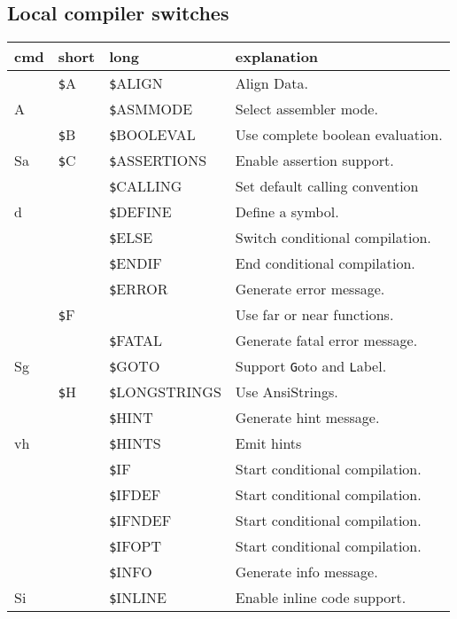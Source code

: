 \documentclass{article}
\newcommand{\var}[1]{{\texttt #1}}
\begin{document}
\thispagestyle{empty}
\subsection*{Local compiler switches}
\begin{tabularx}{\textwidth}{lllX}
\textbf{cmd} & \textbf {short} & \textbf {long} & \textbf{explanation }\\ \hline
& \var{\$A} & \var{\$ALIGN} & Align Data.\\
A & & \var{\$ASMMODE} & Select assembler mode. \\
&\var{\$B} & \var{\$BOOLEVAL} & Use complete boolean evaluation. \\
Sa &\var{\$C} & \var{\$ASSERTIONS} & Enable assertion support. \\
& & \var{\$CALLING} & Set default calling convention \\
d && \var{\$DEFINE} & Define a symbol. \\
&& \var{\$ELSE} & Switch conditional compilation. \\
&& \var{\$ENDIF} & End conditional compilation. \\
&& \var{\$ERROR} & Generate error message. \\
&\var{\$F} & & Use far or near functions. \\
&&  \var{\$FATAL} & Generate fatal error message. \\
Sg && \var{\$GOTO} & Support \var{Goto} and \var{Label}. \\ 
&\var{\$H} & \var{\$LONGSTRINGS} & Use AnsiStrings. \\
 && \var{\$HINT} & Generate hint message. \\
vh && \var{\$HINTS} & Emit hints \\
&& \var{\$IF} & Start conditional compilation. \\
&& \var{\$IFDEF} & Start conditional compilation. \\
&& \var{\$IFNDEF} & Start conditional compilation. \\
&& \var{\$IFOPT} & Start conditional compilation. \\
&& \var{\$INFO} & Generate info message. \\
Si && \var{\$INLINE} & Enable inline code support. \\

\end{tabularx}
\end{document}
